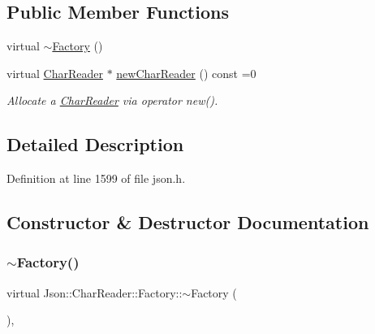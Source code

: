\subsection*{Public Member Functions}
\begin{DoxyCompactItemize}
\item 
virtual \hyperlink{class_json_1_1_char_reader_1_1_factory_ae6938f632fa57f88e05818add5bc21be}{$\sim$\+Factory} ()
\item 
virtual \hyperlink{class_json_1_1_char_reader}{Char\+Reader} $\ast$ \hyperlink{class_json_1_1_char_reader_1_1_factory_a4c5862a1ffd432372dbe65cf59de98c4}{new\+Char\+Reader} () const =0
\begin{DoxyCompactList}\small\item\em Allocate a \hyperlink{class_json_1_1_char_reader}{Char\+Reader} via operator new(). \end{DoxyCompactList}\end{DoxyCompactItemize}


\subsection{Detailed Description}


Definition at line 1599 of file json.\+h.



\subsection{Constructor \& Destructor Documentation}
\mbox{\label{class_json_1_1_char_reader_1_1_factory_ae6938f632fa57f88e05818add5bc21be}} 
\subsubsection{\texorpdfstring{$\sim$\+Factory()}{~Factory()}}
{\footnotesize\ttfamily virtual Json\+::\+Char\+Reader\+::\+Factory\+::$\sim$\+Factory (\begin{DoxyParamCaption}{ }\end{DoxyParamCaption})\hspace{0.3cm}{\ttfamily [inline]}, {\ttfamily [virtual]}}



